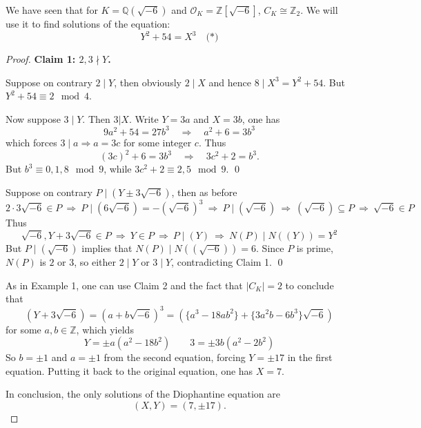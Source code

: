 \begin{example}
We have seen that for $K = \mathbb{Q}(\sqrt{-6})$ and $\mathcal{O}_K = \mathbb{Z}[\sqrt{-6}]$, $C_K \cong \mathbb{Z}_2$. We will use it to find solutions of the equation:
\[
Y^2 + 54 = X^3 \quad \text{(*)}
\]
\end{example}
\begin{proof} {\bf Claim 1: $2, 3 \nmid Y$.}

Suppose on contrary $2 \mid Y$, then obviously $2 \mid X$ and hence $8 \mid X^3 = Y^2 + 54$. But $Y^2+54 \equiv 2 \mod 4$. 

Now suppose $3 \mid Y$. Then $3 | X$. Write $Y = 3a$ and $X = 3b$, one has
$$9a^2 + 54 = 27b^3 \quad \Rightarrow \quad a^2 + 6 = 3b^3$$
which forces $3 \mid a \Rightarrow a =3c$ for some integer $c$. Thus
$$(3c)^2 + 6 = 3b^3 \quad \Rightarrow\quad 3c^2 + 2 = b^3.$$
But $b^3 \equiv 0,1,8 \mod 9$, while $3c^2 + 2 \equiv 2, 5 \mod 9$.  \qed

\medskip
{}

Suppose on contrary $P \mid (Y \pm 3\sqrt{-6})$, then as before
$$2 \cdot 3\sqrt{-6} \in P \ \Rightarrow\ P \mid (6\sqrt{-6}) = -(\sqrt{-6})^3 \ \Rightarrow \ P \mid (\sqrt{-6})\ \Rightarrow \ (\sqrt{-6}) \subseteq P \ \Rightarrow \ \sqrt{-6} \in P$$
Thus
$$\sqrt{-6}, Y + 3\sqrt{-6} \in P\ \Rightarrow\ Y \in P \ \Rightarrow \  P \mid (Y)\ \Rightarrow\ N(P) \mid N((Y)) = Y^2$$
But $P \mid (\sqrt{-6})$ implies that $N(P) \mid N((\sqrt{-6}))=6$. Since $P$ is prime, $N(P)$ is $2$ or $3$, so either $2\mid Y$ or $3\mid Y$, contradicting Claim 1. \qed


\bigskip
As in Example 1, one can use Claim 2 and the fact that $|C_K| =2$ to conclude that 
$$(Y + 3\sqrt{-6}) = (a + b \sqrt{-6})^3 = (\{a^3-18ab^2\} + \{3a^2b-6b^3\}\sqrt{-6})$$
for some $a,b \in \mathbb{Z}$, which yields
$$Y = \pm a(a^2-18b^2) \quad \quad 3 = \pm 3b(a^2-2b^2)$$
So $b = \pm 1$ and $a=\pm1$ from the second equation, forcing $Y=\pm17$ in the first equation. Putting it back to the original equation, one has $X = 7$.

\medskip
In conclusion, the only solutions of the Diophantine equation are
\[
(X,Y) = (7, \pm 17).
\]
\end{proof}
